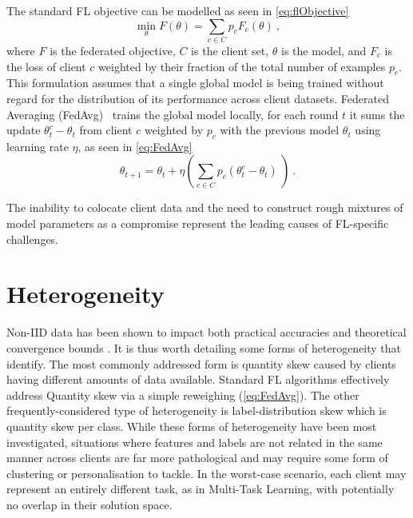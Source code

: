
The standard FL objective can be modelled as seen in \cref{eq:flObjective}
\begin{equation} \label{eq:flObjective}
    \underset{\theta}{\min} F(\theta) = \sum_{c \in C} p_c F_c(\theta) \ ,
\end{equation}
where \(F\) is the federated objective, $C$ is the client set, $\theta$ is the model, and \(F_c\) is the loss of client \(c\) weighted by their fraction of the total number of examples $p_c$. This formulation assumes that a single global model is being trained without regard for the distribution of its performance across client datasets. Federated Averaging (FedAvg)~\citep{FedAvg} trains the global model locally, for each round $t$ it sums the update \(\theta_t^c - \theta_t\) from client $c$ weighted by \(p_c\) with the previous model \(\theta_t\) using learning rate \( \eta \), as seen in \cref{eq:FedAvg}
\begin{equation} \label{eq:FedAvg}
    \theta_{t+1} = \theta_t + \eta \left( \sum_{c \in C} p_c \left(\theta_t^c - \theta_t \right) \ \right) \ .
\end{equation}

The inability to colocate client data and the need to construct rough mixtures of model parameters as a compromise represent the leading causes of FL-specific challenges.

\section{Heterogeneity}\label{background:data_heterogeneity}

Non-IID data has been shown to impact both practical accuracies \citep{FLwithNonIID, NonIIDQagmire} and theoretical convergence bounds \citep{OnTheConvergenceOfFedAvgOnNonIIDdata}. It is thus worth detailing some forms of heterogeneity that \citet{AdvancedAndOpenProblems} identify. The most commonly addressed form is quantity skew caused by clients having different amounts of data available. Standard FL algorithms effectively address Quantity skew via a simple reweighing (\cref{eq:FedAvg}). The other frequently-considered type of heterogeneity is label-distribution skew which is quantity skew per class. While these forms of heterogeneity have been most investigated, situations where features and labels are not related in the same manner across clients are far more pathological and may require some form of clustering or personalisation to tackle. In the worst-case scenario, each client may represent an entirely different task, as in Multi-Task Learning, with potentially no overlap in their solution space.


